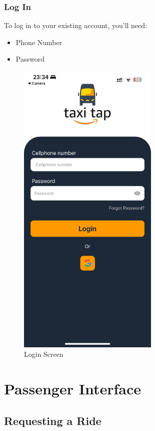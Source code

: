 \documentclass[12pt]{article}
\begin{document}
\subsubsection{Log In}
To log in to your existing account, you'll need:
\begin{itemize}
    \item Phone Number
    \item Password
\end{itemize}

\begin{figure}[H]
  \centering
  \includegraphics[width=0.6\textwidth]{login2.png}
  \caption{Login Screen}
\end{figure}

\newpage

\section{Passenger Interface}

\subsection{Requesting a Ride}
\end{document}
